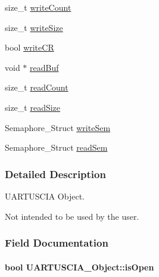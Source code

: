 \begin{DoxyCompactItemize}
\item 
size\+\_\+t \hyperlink{struct_u_a_r_t_u_s_c_i_a___object_aee4f305446fbc61c6935e692384f72cc}{write\+Count}
\item 
size\+\_\+t \hyperlink{struct_u_a_r_t_u_s_c_i_a___object_adc9865fce35c011954aa0871dacca758}{write\+Size}
\item 
bool \hyperlink{struct_u_a_r_t_u_s_c_i_a___object_a5e33711aa2a63b6f4e80c934aafcfa3c}{write\+C\+R}
\item 
void $\ast$ \hyperlink{struct_u_a_r_t_u_s_c_i_a___object_a4ff39008eae85b310fa48359f90179d0}{read\+Buf}
\item 
size\+\_\+t \hyperlink{struct_u_a_r_t_u_s_c_i_a___object_adb1e69a9b2ef8037b082d47f84cdabe5}{read\+Count}
\item 
size\+\_\+t \hyperlink{struct_u_a_r_t_u_s_c_i_a___object_a090e54b299cba93e4ae8494081c9cb1d}{read\+Size}
\item 
Semaphore\+\_\+\+Struct \hyperlink{struct_u_a_r_t_u_s_c_i_a___object_a5c99cc071d0e9d71c329147a65dcc95e}{write\+Sem}
\item 
Semaphore\+\_\+\+Struct \hyperlink{struct_u_a_r_t_u_s_c_i_a___object_a7f88d31f755309e5b48fc2b5256db1ad}{read\+Sem}
\end{DoxyCompactItemize}


\subsubsection{Detailed Description}
U\+A\+R\+T\+U\+S\+C\+I\+A Object. 

Not intended to be used by the user. 

\subsubsection{Field Documentation}
\paragraph[{is\+Open}]{\setlength{\rightskip}{0pt plus 5cm}bool U\+A\+R\+T\+U\+S\+C\+I\+A\+\_\+\+Object\+::is\+Open}\label{struct_u_a_r_t_u_s_c_i_a___object_a95e071a9a1ef58077fa291a1ca259419}

